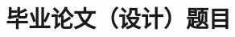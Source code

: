 \documentclass[fangfont=STFANGSO.TTF,heifont=YaHeiConsolas.ttf]{zju-proposal}
\title{毕业论文（设计）题目}{浙江大学本科生毕业论文（设计）}
\begin{document}
	\makecover
	
	
	\tableofcontents
	
	\begin{refsection}	
	
	\end{refsection}
	
	\begin{refsection}
	
	\end{refsection}
	
	
	
	
	
	 
\end{document}
